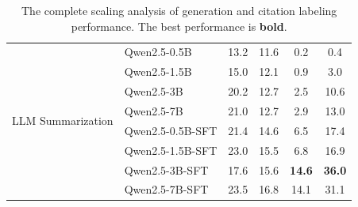 \documentclass[11pt]{article}
\begin{document}
\begin{table}[hb]
\begin{tabular}{@{}llcccc@{}}
        \midrule
        \multirow{8}{*}{LLM Summarization} 
        &Qwen2.5-0.5B & 13.2&11.6 & 0.2 & 0.4 \\
        &Qwen2.5-1.5B & 15.0 & 12.1 &0.9 & 3.0\\
        &Qwen2.5-3B & 20.2 & 12.7 & 2.5 &10.6\\
        &Qwen2.5-7B & 21.0 & 12.7 & 2.9 & 13.0\\
        \cmidrule(lr){2-6}
        &Qwen2.5-0.5B-SFT & 21.4 & 14.6 & 6.5 & 17.4\\
        &Qwen2.5-1.5B-SFT & 23.0 & 15.5 & 6.8 & 16.9\\
        &Qwen2.5-3B-SFT & 17.6 & 15.6 & \textbf{14.6} & \textbf{36.0}\\
        &Qwen2.5-7B-SFT & 23.5&16.8& 14.1 & 31.1\\

        
        \bottomrule
    \end{tabular}
    \caption{The complete scaling analysis of generation and citation labeling performance. The best performance is \textbf{bold}.}
    \label{tab: comparison_of_different_size}
\end{table}
\end{document}
